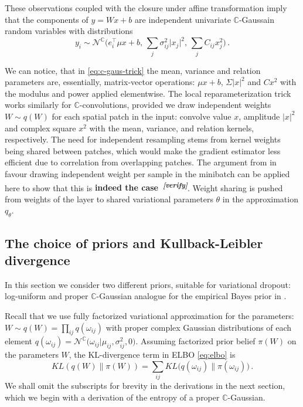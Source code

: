 \documentclass[a4paper,10pt]{article}
\newcommand{\cplx}{\mathbb{C}}
\newcommand{\attn}[2]{\textbf{\color{red} #2~\textsuperscript{\textit{[#1]}}}}
\newcommand{\verify}[1]{\attn{verify}{#1}}
\begin{document}
These observations coupled with the closure under affine transformation imply that the
components of $y = W x + b$ are independent univariate $\cplx$-Gaussain random variables
with distributions
\begin{equation} \label{eq:c-gaus-trick}
  y_i
    \sim \mathcal{N}^{\cplx}
      \bigl(
        e_i^\top \mu x + b,
        \, \sum_j \sigma^2_{ij} \lvert x_j \rvert^2,
        \, \sum_j C_{ij} x_j^2
      \bigr)
    \,.
\end{equation}

We can notice, that in \eqref{eq:c-gaus-trick} the mean, variance and relation parameters are,
essentially, matrix-vector operations: $\mu x + b$, $\Sigma \lvert x \rvert^2$ and $C x^2$
with the modulus and power applied elementwise. The local reparameterization trick works
similarly for $\cplx$-convolutions, provided we draw independent weights $W\sim q(W)$ for each
spatial patch in the input: convolve value $x$, amplitude $\lvert x \rvert^2$ and complex
square $x^2$ with the mean, variance, and relation kernels, respectively. The need for
independent resampling stems from kernel weights being shared between patches, which would
make the gradient estimator less efficient due to correlation from overlapping patches.
The argument from \cite{kingma_variational_2015} in favour drawing independent weight per
sample in the minibatch can be applied here to show that this is \verify{indeed the case}.
%
Weight sharing is pushed from weights of the layer to shared variational parameters $\theta$
in the approximation $q_\theta$.


\subsection{The choice of priors and Kullback-Leibler divergence} %
\label{sub:priors_and_kullback_leibler_divergence}

In this section we consider two different priors, suitable for variational dropout: log-uniform
\cite{kingma_variational_2015,molchanov_variational_2017} and proper $\cplx$-Gaussian analogue
for the empirical Bayes prior in \cite{kharitonov_variational_2018}.

Recall that we use fully factorized variational approximation for the parameters: $
  W \sim q(W)
    = \prod_{ij} q(\omega_{ij})
$ with proper complex Gaussian distributions of each element $
  q(\omega_{ij})
    = \mathcal{N}^{\cplx}\bigl(
      \omega_{ij} \big\vert
      \mu_{ij}, \sigma^2_{ij}, 0
    \bigr)
$. Assuming factorized prior belief $\pi(W)$ on the parameters $W$, the KL-divergence
term in ELBO \eqref{eq:elbo} is
\begin{equation}  \label{eq:elbo-general-kl-div}
KL(q(W) \| \pi(W))
  = \sum_{ij} KL\bigl(
    q(\omega_{ij}) \| \pi(\omega_{ij})
  \bigr)
  \,.
\end{equation}
%
We shall omit the subscripts for brevity in the derivations in the next section, which
we begin with a derivation of the entropy of a proper $\cplx$-Gaussian.
\end{document}
